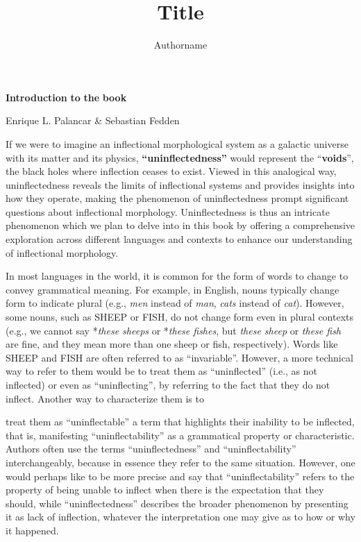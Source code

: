 \documentclass[output=paper]{langscibook}
\author{Authorname\orcid{}\affiliation{}}
\title{Title}
\begin{document}
\maketitle 

\textbf{Introduction} \textbf{to} \textbf{the} \textbf{book}

Enrique L. Palancar \& Sebastian Fedden

  If we were to imagine an inflectional morphological system as a galactic universe with its matter and its physics, \textbf{“uninflectedness”} would represent the “\textbf{voids}”, the black holes where inflection ceases to exist. Viewed in this analogical way, uninflectedness reveals the limits of inflectional systems and provides insights into how they operate, making the phenomenon of uninflectedness prompt significant questions about inflectional morphology. Uninflectedness is thus an intricate phenomenon which we plan to delve into in this book by offering a comprehensive exploration across different languages and contexts to enhance our understanding of inflectional morphology. 

  In most languages in the world, it is common for the form of words to change to convey grammatical meaning. For example, in English, nouns typically change form to indicate plural (e.g., \textit{men} instead of \textit{man}, \textit{cats} instead of \textit{cat}). However, some nouns, such as SHEEP or FISH, do not change form even in plural contexts (e.g., we cannot say *\textit{these sheeps} or *\textit{these fishes}, but \textit{these sheep} or \textit{these fish} are fine, and they mean more than one sheep or fish, respectively). Words like SHEEP and FISH are often referred to as “invariable”. However, a more technical way to refer to them would be to treat them as “uninflected” (i.e., as not inflected) or even as “uninflecting”, by referring to the fact that they do not inflect. Another way to characterize them is to 

treat them as “uninflectable” a term that highlights their inability to be inflected, that is, manifesting “uninflectability” as a grammatical property or characteristic. Authors often use the terms “uninflectedness” and “uninflectability” interchangeably, because in essence they refer to the same situation. However, one would perhaps like to be more precise and say that “uninflectability” refers to the property of being unable to inflect when there is the expectation that they should, while “uninflectedness” describes the broader phenomenon by presenting it as lack of inflection, whatever the interpretation one may give as to how or why it happened. 
\end{document}
